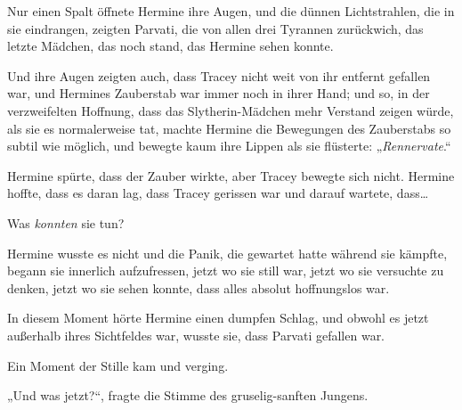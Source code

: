 Nur einen Spalt öffnete Hermine ihre Augen, und die dünnen Lichtstrahlen, die in sie eindrangen, zeigten Parvati, die von allen drei Tyrannen zurückwich, das letzte Mädchen, das noch stand, das Hermine sehen konnte.

Und ihre Augen zeigten auch, dass Tracey nicht weit von ihr entfernt gefallen war, und Hermines Zauberstab war immer noch in ihrer Hand; und so, in der verzweifelten Hoffnung, dass das Slytherin-Mädchen mehr Verstand zeigen würde, als sie es normalerweise tat, machte Hermine die Bewegungen des Zauberstabs so subtil wie möglich, und bewegte kaum ihre Lippen als sie flüsterte: „\emph{Rennervate}.“

Hermine spürte, dass der Zauber wirkte, aber Tracey bewegte sich nicht. Hermine hoffte, dass es daran lag, dass Tracey gerissen war und darauf wartete, dass…

Was \emph{konnten} sie tun?

Hermine wusste es nicht und die Panik, die gewartet hatte während sie kämpfte, begann sie innerlich aufzufressen, jetzt wo sie still war, jetzt wo sie versuchte zu denken, jetzt wo sie sehen konnte, dass alles absolut hoffnungslos war.

In diesem Moment hörte Hermine einen dumpfen Schlag, und obwohl es jetzt außerhalb ihres Sichtfeldes war, wusste sie, dass Parvati gefallen war.

Ein Moment der Stille kam und verging.

„Und was jetzt?“, fragte die Stimme des gruselig-sanften Jungens.

